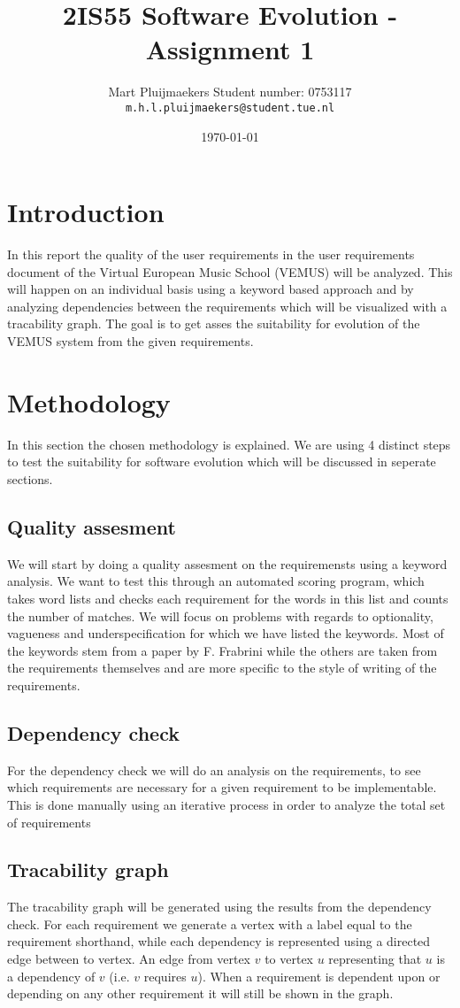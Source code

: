 \documentclass[a4paper,twoside,11pt]{article}
\title{\sffamily\bfseries 2IS55 Software Evolution - Assignment 1}
\author{Mart Pluijmaekers \qquad Student number: 0753117 \\{\tt m.h.l.pluijmaekers@student.tue.nl}}
\date{\today}
\begin{document}
\maketitle
\tableofcontents
\newpage

\section{Introduction}
In this report the quality of the user requirements in the user requirements document of the Virtual European Music School (VEMUS) will be analyzed. This will happen on an individual basis using a keyword based approach and by analyzing dependencies between the requirements which will be visualized with a tracability graph. The goal is to get asses the suitability for evolution of the VEMUS system from the given requirements. 

\section{Methodology}
In this section the chosen methodology is explained. We are using 4 distinct steps to test the suitability for software evolution which will be discussed in seperate sections. 
\subsection{Quality assesment}
We will start by doing a quality assesment on the requiremensts using a keyword analysis. We want to test this through an automated scoring program, which takes word lists and checks each requirement for the words in this list and counts the number of matches. We will focus on problems with regards to optionality, vagueness and underspecification for which we have listed the keywords. Most of the keywords stem from a paper by F. Frabrini\cite{paper:ling_approach} while the others are taken from the requirements themselves and are more specific to the style of writing of the requirements.
\medskip


\subsection{Dependency check}
For the dependency check we will do an analysis on the requirements, to see which requirements are necessary for a given requirement to be implementable. This is done manually using an iterative process in order to analyze the total set of requirements

\subsection{Tracability graph}
The tracability graph will be generated using the results from the dependency check. For each requirement we generate a vertex with a label equal to the requirement shorthand, while each dependency is represented using a directed edge between to vertex. An edge from vertex $v$ to vertex $u$ representing that $u$ is a dependency of $v$ (i.e. $v$ requires $u$). When a requirement is dependent upon or depending on any other requirement it will still be shown in the graph.
 
\end{document}
